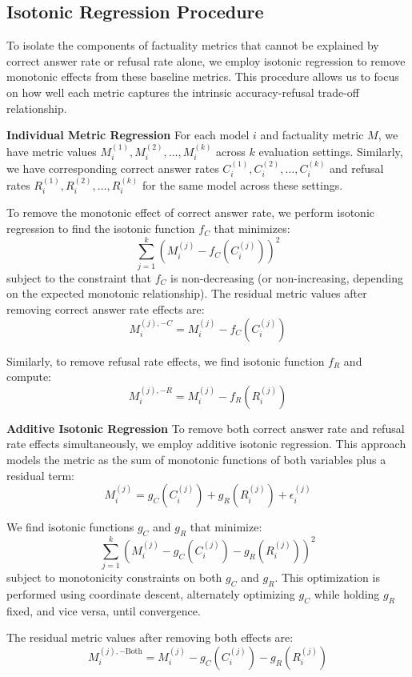 \documentclass{article} %
\theoremstyle{definition}
\begin{document}
\subsection{Isotonic Regression Procedure}

To isolate the components of factuality metrics that cannot be explained by correct answer rate or refusal rate alone, we employ isotonic regression to remove monotonic effects from these baseline metrics. This procedure allows us to focus on how well each metric captures the intrinsic accuracy-refusal trade-off relationship.

\noindent\textbf{Individual Metric Regression}
For each model $i$ and factuality metric $M$, we have metric values $M_i^{(1)}, M_i^{(2)}, \ldots, M_i^{(k)}$ across $k$ evaluation settings. Similarly, we have corresponding correct answer rates $C_i^{(1)}, C_i^{(2)}, \ldots, C_i^{(k)}$ and refusal rates $R_i^{(1)}, R_i^{(2)}, \ldots, R_i^{(k)}$ for the same model across these settings.

To remove the monotonic effect of correct answer rate, we perform isotonic regression to find the isotonic function $f_C$ that minimizes:
\[
\sum_{j=1}^{k} (M_i^{(j)} - f_C(C_i^{(j)}))^2
\]
subject to the constraint that $f_C$ is non-decreasing (or non-increasing, depending on the expected monotonic relationship). The residual metric values after removing correct answer rate effects are:
\[
M_i^{(j), -C} = M_i^{(j)} - f_C(C_i^{(j)})
\]

Similarly, to remove refusal rate effects, we find isotonic function $f_R$ and compute:
\[
M_i^{(j), -R} = M_i^{(j)} - f_R(R_i^{(j)})
\]

\noindent\textbf{Additive Isotonic Regression}
To remove both correct answer rate and refusal rate effects simultaneously, we employ additive isotonic regression. This approach models the metric as the sum of monotonic functions of both variables plus a residual term:
\[
M_i^{(j)} = g_C(C_i^{(j)}) + g_R(R_i^{(j)}) + \epsilon_i^{(j)}
\]

We find isotonic functions $g_C$ and $g_R$ that minimize:
\[
\sum_{j=1}^{k} (M_i^{(j)} - g_C(C_i^{(j)}) - g_R(R_i^{(j)}))^2
\]
subject to monotonicity constraints on both $g_C$ and $g_R$. This optimization is performed using coordinate descent, alternately optimizing $g_C$ while holding $g_R$ fixed, and vice versa, until convergence.

The residual metric values after removing both effects are:
\[
M_i^{(j), -\text{Both}} = M_i^{(j)} - g_C(C_i^{(j)}) - g_R(R_i^{(j)})
\]
\end{document}

